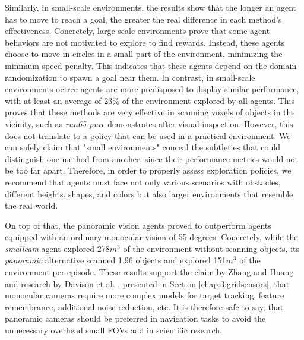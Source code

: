     Similarly, in small-scale environments, the results show that the longer an agent has to move to reach a goal, the greater the real difference in each method's effectiveness.
    Concretely, large-scale environments prove that some agent behaviors are not motivated to explore to find rewards. Instead, these agents choose to move in circles in a small part of the environment, minimizing the minimum speed penalty. This indicates that these agents depend on the domain randomization to spawn a goal near them.
    In contrast, in small-scale environments octree agents are more predisposed to display similar performance, with at least an average of 23\% of the environment explored by all agents.
    This proves that these methods are very effective in scanning voxels of objects in the vicinity, such as \textit{run65-pure} demonstrates after visual inspection. However, this does not translate to a policy that can be used in a practical environment.
    We can safely claim that "small environments" conceal the subtleties that could distinguish one method from another, since their performance metrics would not be too far apart. 
    Therefore, in order to properly assess exploration policies, we recommend that agents must face not only various scenarios with obstacles, different heights, shapes, and colors but also larger environments that resemble the real world.

    On top of that, the panoramic vision agents proved to outperform agents equipped with an ordinary monocular vision of 55 degrees. Concretely, while the \textit{smallcam} agent explored 278$m^3$ of the environment without scanning objects, its \textit{panoramic} alternative scanned 1.96 objects and explored 151$m^3$ of the environment per episode. These results support the claim by Zhang and Huang \cite{zhang2021panoramic} and research by Davison et al. \cite{davison2007monoslam}, presented in Section \ref{chap:3:gridsensors}, that monocular cameras require more complex models for target tracking, feature remembrance, additional noise reduction, etc. It is therefore safe to say, that panoramic cameras should be preferred in navigation tasks to avoid the unnecessary overhead small FOVs add in scientific research.
    
